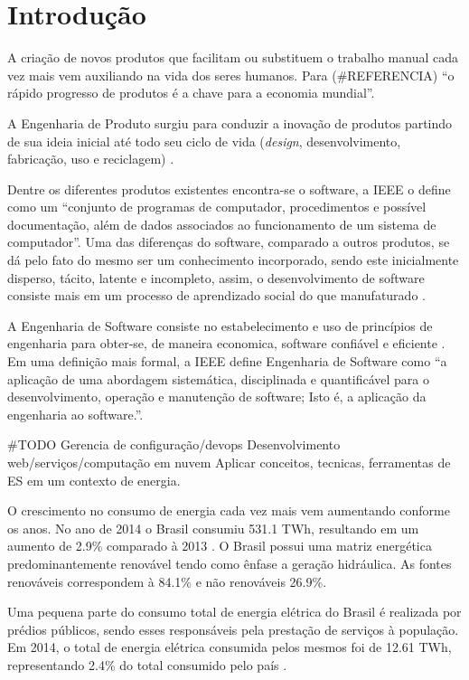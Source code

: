 \chapter{Introdução}
A criação de novos produtos que facilitam ou substituem o trabalho manual cada vez mais vem auxiliando na vida dos seres humanos. Para (\#REFERENCIA) ``o rápido progresso de produtos é a chave para a economia mundial''.

A Engenharia de Produto surgiu para conduzir a inovação de produtos partindo de sua ideia inicial até todo seu ciclo de vida (\textit{design}, desenvolvimento, fabricação, uso e reciclagem) \cite{ortloff2014}.

Dentre os diferentes produtos existentes encontra-se o software, a IEEE \cite{ieee_glossary} o define como um ``conjunto de programas de computador, procedimentos e possível documentação, além de dados associados ao funcionamento de um sistema de computador''. Uma das diferenças do software, comparado a outros produtos, se dá pelo fato do mesmo ser um conhecimento incorporado, sendo este inicialmente disperso, tácito, latente e incompleto, assim, o desenvolvimento de software consiste mais em um processo de aprendizado social do que manufaturado \cite{baetjer1997}.

A Engenharia de Software consiste no estabelecimento e uso de princípios de engenharia para obter-se, de maneira economica, software confiável e eficiente \cite{naur_1969}. Em uma definição mais formal, a IEEE \cite{ieee_glossary} define Engenharia de Software como ``a aplicação de uma abordagem sistemática, disciplinada e quantificável para o desenvolvimento, operação e manutenção de software; Isto é, a aplicação da engenharia ao software.''.

\#TODO Gerencia de configuração/devops
Desenvolvimento web/serviços/computação em nuvem
Aplicar conceitos, tecnicas, ferramentas de ES em um contexto de energia.

O crescimento no consumo de energia cada vez mais vem aumentando conforme os anos. No
ano de 2014 o Brasil consumiu 531.1 TWh, resultando em um aumento de 2.9\% comparado à 2013 \cite{balanco_energetico}. O Brasil possui uma matriz energética predominantemente renovável tendo como ênfase a geração hidráulica. As fontes renováveis correspondem à 84.1\% e não renováveis 26.9\%.

Uma pequena parte do consumo total de energia elétrica do Brasil é realizada por prédios públicos, sendo
esses responsáveis pela prestação de serviços à população. Em 2014, o total de energia elétrica consumida
pelos mesmos foi de 12.61 TWh, representando 2.4\% do total consumido pelo país \cite{balanco_energetico}.


